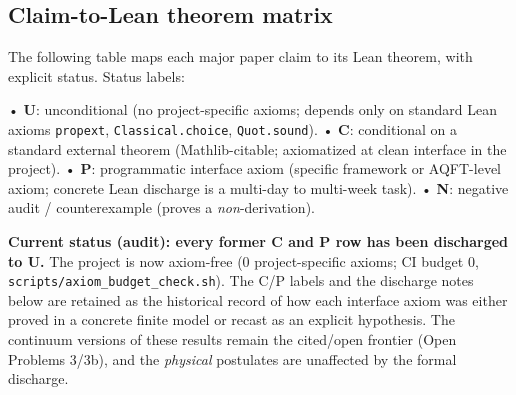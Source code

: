 \documentclass[11pt,a4paper]{article}
\begin{document}
\subsection{Claim-to-Lean theorem matrix}

The following table maps each major paper claim to its Lean theorem, with explicit status. Status labels:

  • \textbf{U}: unconditional (no project-specific axioms; depends only on standard Lean axioms \texttt{propext}, \texttt{Classical.choice}, \texttt{Quot.sound}).
  • \textbf{C}: conditional on a standard external theorem (Mathlib-citable; axiomatized at clean interface in the project).
  • \textbf{P}: programmatic interface axiom (specific framework or AQFT-level axiom; concrete Lean discharge is a multi-day to multi-week task).
  • \textbf{N}: negative audit / counterexample (proves a \emph{non}-derivation).

\textbf{Current status (audit): every former C and P row has been discharged to U.} The project is now axiom-free (0 project-specific axioms; CI budget 0, \texttt{scripts/axiom\_budget\_check.sh}). The C/P labels and the discharge notes below are retained as the historical record of how each interface axiom was either proved in a concrete finite model or recast as an explicit hypothesis. The continuum versions of these results remain the cited/open frontier (Open Problems 3/3b), and the \emph{physical} postulates are unaffected by the formal discharge.
\end{document}
